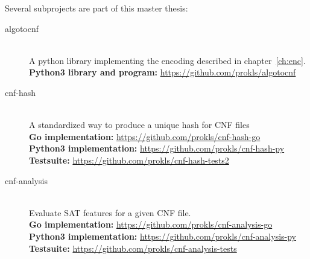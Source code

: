 Several subprojects are part of this master thesis:
\begin{description}
\item[algotocnf]\hfill{} \\
  A python library implementing the encoding described in chapter~\ref{ch:enc}. \\[4pt]
  \textbf{Python3 library and program:} \url{https://github.com/prokls/algotocnf}
\item[cnf-hash]\hfill{} \\
  A standardized way to produce a unique hash for CNF files \\[4pt]
  \textbf{Go implementation:} \url{https://github.com/prokls/cnf-hash-go} \\
  \textbf{Python3 implementation:} \url{https://github.com/prokls/cnf-hash-py} \\
  \textbf{Testsuite:} \url{https://github.com/prokls/cnf-hash-tests2}
\item[cnf-analysis]\hfill{} \\
  Evaluate SAT features for a given CNF file. \\[4pt]
  \textbf{Go implementation:} \url{https://github.com/prokls/cnf-analysis-go} \\
  \textbf{Python3 implementation:} \url{https://github.com/prokls/cnf-analysis-py} \\
  \textbf{Testsuite:} \url{https://github.com/prokls/cnf-analysis-tests}
\end{description}
